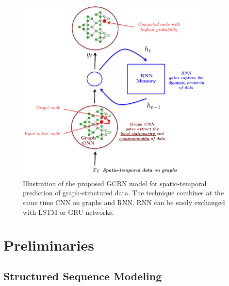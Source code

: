 \documentclass{article} %
\newcommand{\todo}[1]{{\color{red} #1 }}
\begin{document}
\begin{figure}[ht]
	\centering
	\includegraphics[width=10cm]{figures/gcnn_rnn.pdf}
	\caption{Illustration of the proposed GCRN model for spatio-temporal prediction of graph-structured data. The technique combines at the same time CNN on graphs and RNN. RNN can be easily exchanged with LSTM or GRU networks.} 
	\label{fig1}
\end{figure}





\section{Preliminaries}


\subsection{Structured Sequence Modeling}
\end{document}
